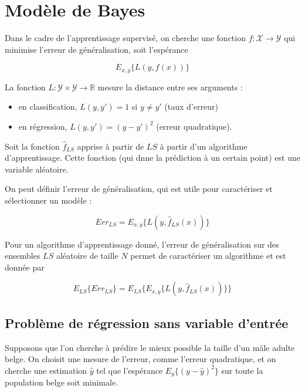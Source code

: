 \chapter{Modèle de Bayes}

Dans le cadre de l'apprentissage supervisé, on cherche une fonction $f : \mathcal{X} \rightarrow \mathcal{Y}$ qui minimise l'erreur de généralisation, soit l'espérance

$$E_{x, y} \{L(y, f(x))\}$$

La fonction $L : \mathcal{Y} \times \mathcal{Y} \rightarrow \mathbb{R}$ mesure la distance entre ses arguments :

\begin{itemize}
	\item en classification, $L(y, y') = 1$ si $y \neq y'$ (taux d'erreur)
	\item en régression, $L(y, y') = (y - y')^2$ (erreur quadratique).
\end{itemize}

Soit la fonction $\hat{f}_{LS}$ apprise à partir de $LS$ à partir d'un algorithme d'apprentissage. Cette fonction (qui dnne la prédiction à un certain point) est une variable aléatoire.


On peut définir l'erreur de généralisation, qui est utile pour caractériser et sélectionner un modèle :

$$Err_{LS} = E_{x, y} \{L(y, \hat{f}_{LS}(x))\}$$

Pour un algorithme d'apprentissage donné, l'erreur de généralisation sur des ensembles $LS$ aléatoire de taille $N$ permet de caractériser un algorithme et est donnée par

$$E_{LS}\{Err_{LS}\} = E_{LS}\{E_{x, y} \{L(y, \hat{f}_{LS}(x))\} \}$$

	\section{Problème de régression sans variable d'entrée}
	
	Supposons que l'on cherche à prédire le mieux possible la taille d'un mâle adulte belge. On choisit une mesure de l'erreur, comme l'erreur quadratique, et on cherche une estimation $\hat{y}$ tel que l'espérance $E_y\{(y - \hat{y})^2\}$ sur toute la population belge soit minimale.
	
	\newcommand{\ey}[1]{E_y\{#1\}}
	\newcommand{\els}[1]{E_{LS}\{#1\}}
	\newcommand{\yh}{\hat{y}}
	\newcommand{\vary}[1]{var_y\{#1\}}
	\newcommand{\varls}[1]{var_{LS}\{#1\}}
	
